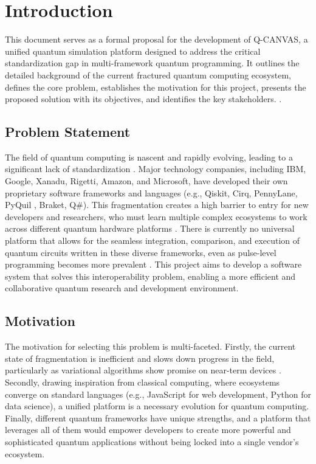 \chapter{Introduction}
\label{ch:introduction}
This document serves as a formal proposal for the development of Q-CANVAS, a unified quantum simulation platform designed to address the critical standardization gap in multi-framework quantum programming. It outlines the detailed background of the current fractured quantum computing ecosystem, defines the core problem, establishes the motivation for this project, presents the proposed solution with its objectives, and identifies the key stakeholders. \cite{test}.

\section{Problem Statement}

The field of quantum computing is nascent and rapidly evolving, leading to a significant lack of standardization \cite{exp2017}. Major technology companies, including IBM, Google, Xanadu, Rigetti, Amazon, and Microsoft, have developed their own proprietary software frameworks and languages (e.g., Qiskit, Cirq, PennyLane, PyQuil \cite{quil2021}, Braket, Q\#). This fragmentation creates a high barrier to entry for new developers and researchers, who must learn multiple complex ecosystems to work across different quantum hardware platforms \cite{pycqed2021}. There is currently no universal platform that allows for the seamless integration, comparison, and execution of quantum circuits written in these diverse frameworks, even as pulse-level programming becomes more prevalent \cite{alexander2020, nguyen2020}. This project aims to develop a software system that solves this interoperability problem, enabling a more efficient and collaborative quantum research and development environment.

\section{Motivation}
The motivation for selecting this problem is multi-faceted. Firstly, the current state of fragmentation is inefficient and slows down progress in the field, particularly as variational algorithms show promise on near-term devices \cite{peruzzo2014}. Secondly, drawing inspiration from classical computing, where ecosystems converge on standard languages (e.g., JavaScript for web development, Python for data science), a unified platform is a necessary evolution for quantum computing. Finally, different quantum frameworks have unique strengths, and a platform that leverages all of them would empower developers to create more powerful and sophisticated quantum applications without being locked into a single vendor's ecosystem.

